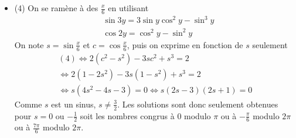 \begin{itemize}
  \item (4) On se ramène à des $\frac{x}{6}$ en utilisant
\begin{align*}
  &\sin 3y = 3\sin y \cos^2y - \sin^3 y \\
  &\cos 2y = \cos^2 y - \sin^2 y
\end{align*}
On note $s=\sin \frac{x}{6}$ et $c=\cos \frac{x}{6}$, puis on exprime en fonction de $s$ seulement
\begin{multline*}
(4)\Leftrightarrow  
2(c^2-s^2)-3sc^2 + s^3 = 2 \\
\Leftrightarrow 2(1-2s^2)-3s(1-s^2) + s^3 = 2 \\
\Leftrightarrow s(4s^2-4s-3)=0
\Leftrightarrow s(2s-3)(2s+1)=0
\end{multline*}
Comme $s$ est un sinus, $s\neq\frac{3}{2}$. Les solutions sont donc seulement obtenues pour $s=0$ ou $-\frac{1}{2}$ soit
les nombres congrus à $0$ modulo $\pi$ ou à $-\frac{\pi}{6}$ modulo $2\pi$ ou à $\frac{7\pi}{6}$ modulo $2\pi$.
\end{itemize}
